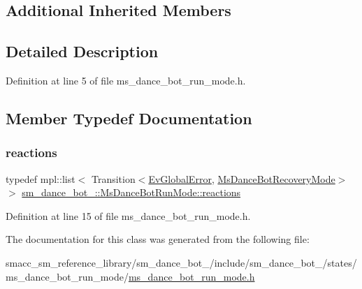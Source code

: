 \subsection*{Additional Inherited Members}


\subsection{Detailed Description}


Definition at line 5 of file ms\+\_\+dance\+\_\+bot\+\_\+run\+\_\+mode.\+h.



\subsection{Member Typedef Documentation}
\mbox{\label{classsm__dance__bot__2_1_1MsDanceBotRunMode_a66cf5d65e04e52d64e448310e4677ede}} 
\subsubsection{\texorpdfstring{reactions}{reactions}}
{\footnotesize\ttfamily typedef mpl\+::list$<$ Transition$<$\hyperlink{structsm__dance__bot__2_1_1EvGlobalError}{Ev\+Global\+Error}, \hyperlink{classsm__dance__bot__2_1_1MsDanceBotRecoveryMode}{Ms\+Dance\+Bot\+Recovery\+Mode}$>$ $>$ \hyperlink{classsm__dance__bot__2_1_1MsDanceBotRunMode_a66cf5d65e04e52d64e448310e4677ede}{sm\+\_\+dance\+\_\+bot\+\_\+::\+Ms\+Dance\+Bot\+Run\+Mode\+::reactions}}



Definition at line 15 of file ms\+\_\+dance\+\_\+bot\+\_\+run\+\_\+mode.\+h.



The documentation for this class was generated from the following file\+:\begin{DoxyCompactItemize}
\item 
smacc\+\_\+sm\+\_\+reference\+\_\+library/sm\+\_\+dance\+\_\+bot\+\_/include/sm\+\_\+dance\+\_\+bot\+\_/states/ms\+\_\+dance\+\_\+bot\+\_\+run\+\_\+mode/\hyperlink{2_2include_2sm__dance__bot__2_2states_2ms__dance__bot__run__mode_2ms__dance__bot__run__mode_8h}{ms\+\_\+dance\+\_\+bot\+\_\+run\+\_\+mode.\+h}\end{DoxyCompactItemize}
